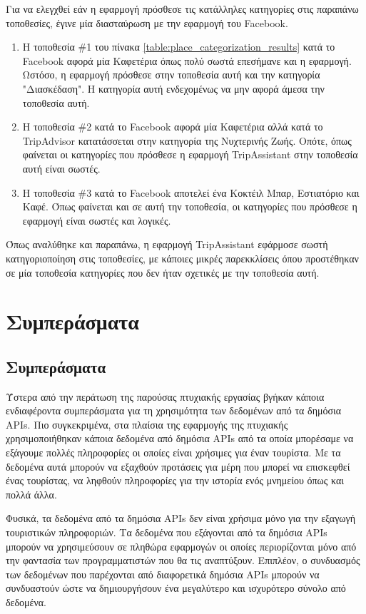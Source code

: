 \documentclass[oneside, 12pt]{book}
\begin{document}
Για να ελεγχθεί εάν η εφαρμογή πρόσθεσε τις κατάλληλες κατηγορίες στις παραπάνω τοποθεσίες, έγινε μία διασταύρωση με την εφαρμογή του Facebook.
\begin{enumerate}
    \item Η τοποθεσία \#1 του πίνακα \ref{table:place_categorization_results} κατά το Facebook αφορά μία Καφετέρια όπως πολύ σωστά επεσήμανε και η εφαρμογή. Ωστόσο, η εφαρμογή πρόσθεσε στην τοποθεσία αυτή και την κατηγορία "Διασκέδαση". Η κατηγορία αυτή ενδεχομένως να μην αφορά άμεσα την τοποθεσία αυτή.
    \item Η τοποθεσία \#2 κατά το Facebook αφορά μία Καφετέρια αλλά κατά το TripAdvisor κατατάσσεται στην κατηγορία της Νυχτερινής Ζωής. Οπότε, όπως φαίνεται οι κατηγορίες που πρόσθεσε η εφαρμογή TripAssistant στην τοποθεσία αυτή είναι σωστές.
    \item Η τοποθεσία \#3 κατά το Facebook αποτελεί ένα Κοκτέιλ Μπαρ, Εστιατόριο και Καφέ. Όπως φαίνεται και σε αυτή την τοποθεσία, οι κατηγορίες που πρόσθεσε η εφαρμογή είναι σωστές και λογικές.
\end{enumerate}
Όπως αναλύθηκε και παραπάνω, η εφαρμογή TripAssistant εφάρμοσε σωστή κατηγοριοποίηση στις τοποθεσίες, με κάποιες μικρές παρεκκλίσεις όπου προστέθηκαν σε μία τοποθεσία κατηγορίες που δεν ήταν σχετικές με την τοποθεσία αυτή.

\chapter{Συμπεράσματα}

\section{Συμπεράσματα}
Ύστερα από την περάτωση της παρούσας πτυχιακής εργασίας βγήκαν κάποια ενδιαφέροντα συμπεράσματα για τη χρησιμότητα των δεδομένων από τα δημόσια APIs.
Πιο συγκεκριμένα, στα πλαίσια της εφαρμογής της πτυχιακής χρησιμοποιήθηκαν κάποια δεδομένα από δημόσια APIs από τα οποία
μπορέσαμε να εξάγουμε πολλές πληροφορίες οι οποίες είναι χρήσιμες για έναν τουρίστα. 
Με τα δεδομένα αυτά μπορούν να εξαχθούν προτάσεις για μέρη που μπορεί να επισκεφθεί ένας τουρίστας, να ληφθούν πληροφορίες για 
την ιστορία ενός μνημείου όπως και πολλά άλλα.

Φυσικά, τα δεδομένα από τα δημόσια APIs δεν είναι χρήσιμα μόνο για την εξαγωγή τουριστικών πληροφοριών. 
Τα δεδομένα που εξάγονται από τα δημόσια APIs μπορούν να χρησιμεύσουν σε πληθώρα εφαρμογών οι οποίες 
περιορίζονται μόνο από την φαντασία των προγραμματιστών που θα τις αναπτύξουν.
Επιπλέον, ο συνδυασμός των δεδομένων που παρέχονται από διαφορετικά δημόσια APIs μπορούν να συνδυαστούν ώστε να δημιουργήσουν ένα μεγαλύτερο και ισχυρότερο σύνολο από δεδομένα.
\end{document}
